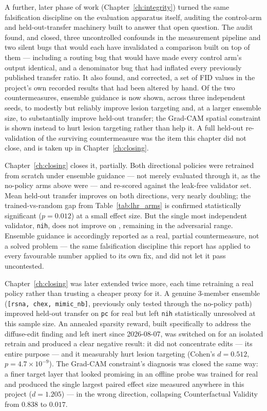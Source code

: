 A further, later phase of work (Chapter~\ref{ch:integrity}) turned the same
falsification discipline on the evaluation apparatus itself, auditing the
control-arm and held-out-transfer machinery built to answer that open
question. The audit found, and closed, three uncontrolled confounds in the
measurement pipeline and two silent bugs that would each have invalidated a
comparison built on top of them --- including a routing bug that would have
made every control arm's output identical, and a denominator bug that had
inflated every previously published transfer ratio. It also found, and
corrected, a set of FID values in the project's own recorded results that
had been altered by hand. Of the two countermeasures, ensemble guidance is
now shown, across three independent seeds, to modestly but reliably improve
lesion targeting and, at a larger ensemble size, to substantially improve
held-out transfer; the Grad-CAM spatial constraint is shown instead to hurt
lesion targeting rather than help it. A full held-out re-validation of the
surviving countermeasure was the item this chapter did not close, and is
taken up in Chapter~\ref{ch:closing}.

Chapter~\ref{ch:closing} closes it, partially. Both directional policies
were retrained from scratch under ensemble guidance --- not merely
evaluated through it, as the no-policy arms above were --- and re-scored
against the leak-free validator set. Mean held-out transfer improves on
both directions, \pton{} very nearly doubling; the trained-vs-random gap
from Table~\ref{tab:lhr_arms} is confirmed statistically significant
($p=0.012$) at a small effect size. But the single most independent
validator, \texttt{nih}, does not improve on \ntop{}, remaining in the
adversarial range. Ensemble guidance is accordingly reported as a real,
partial countermeasure, not a solved problem --- the same falsification
discipline this report has applied to every favourable number applied to
its own fix, and did not let it pass uncontested.

Chapter~\ref{ch:closing} was later extended twice more, each time
retraining a real policy rather than trusting a cheaper proxy for it.
A genuine 3-member ensemble (\texttt{[rsna, chex, mimic\_nb]}, previously
only tested through the no-policy path) improved held-out transfer on
\texttt{pc} for real but left \texttt{nih} statistically unresolved at
this sample size. An annealed sparsity reward, built specifically to
address the diffuse-edit finding and left inert since 2026-08-07, was
switched on for an isolated retrain and produced a clear negative result:
it did not concentrate edits --- its entire purpose --- and it measurably
hurt lesion targeting (Cohen's $d=0.512$, $p=4.7\times10^{-9}$). The
Grad-CAM constraint's diagnosis was closed the same way: a finer target
layer that looked promising in an offline probe was trained for real and
produced the single largest paired effect size measured anywhere in this
project ($d=1.205$) --- in the wrong direction, collapsing Counterfactual
Validity from $0.838$ to $0.017$.


